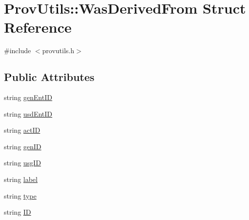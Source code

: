 \hypertarget{struct_prov_utils_1_1_was_derived_from}{\section{Prov\-Utils\-:\-:Was\-Derived\-From Struct Reference}
\label{struct_prov_utils_1_1_was_derived_from}
}


{\ttfamily \#include $<$provutils.\-h$>$}

\subsection*{Public Attributes}
\begin{DoxyCompactItemize}
\item 
string \hyperlink{struct_prov_utils_1_1_was_derived_from_ad38716ef9c4e7e45816ac92fc3e4076b}{gen\-Ent\-I\-D}
\item 
string \hyperlink{struct_prov_utils_1_1_was_derived_from_a8817cd1561cf086b54b5b90f510375c8}{usd\-Ent\-I\-D}
\item 
string \hyperlink{struct_prov_utils_1_1_was_derived_from_a604103420bd0c24bb2eddfad7628753e}{act\-I\-D}
\item 
string \hyperlink{struct_prov_utils_1_1_was_derived_from_a371c5f41d548fab8b774148cd55c3b8e}{gen\-I\-D}
\item 
string \hyperlink{struct_prov_utils_1_1_was_derived_from_aea9320eb588222ecf79a70528bbe3ae3}{usg\-I\-D}
\item 
string \hyperlink{struct_prov_utils_1_1_was_derived_from_ac81c10113fc119b56b62b208534d6391}{label}
\item 
string \hyperlink{struct_prov_utils_1_1_was_derived_from_a3b9eb43df6283b72c988876f5c471aad}{type}
\item 
string \hyperlink{struct_prov_utils_1_1_was_derived_from_acd6605669cb7cd025450656b03b752d2}{I\-D}
\end{DoxyCompactItemize}


